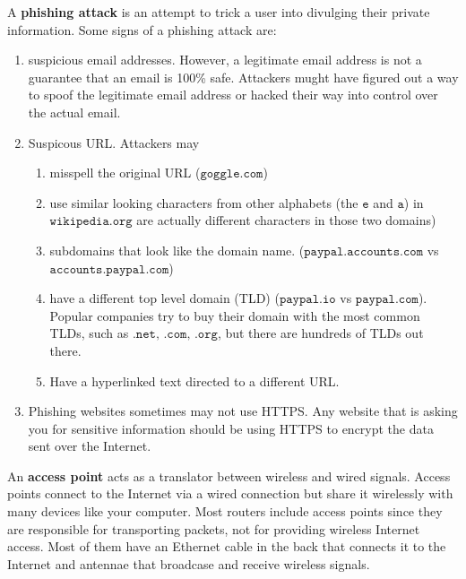 \documentclass{article}
\begin{document}
  A \textbf{phishing attack} is an attempt to trick a user into divulging their private information. Some signs of a phishing attack are: 
  \begin{enumerate}
      \item suspicious email addresses. However, a legitimate email address is not a guarantee that an email is 100\% safe. Attackers mught have figured out a way to spoof the legitimate email address or hacked their way into control over the actual email. 
      \item Suspicous URL. Attackers may
      \begin{enumerate}
          \item misspell the original URL ($\texttt{goggle.com}$)
          \item use similar looking characters from other alphabets (the $\texttt{e}$ and $\texttt{a}$) in $\texttt{wikipedia.org}$ are actually different characters in those two domains)
          \item subdomains that look like the domain name. ($\texttt{paypal.accounts.com}$ vs $\texttt{accounts.paypal.com}$)
          \item have a different top level domain (TLD) ($\texttt{paypal.io}$ vs $\texttt{paypal.com}$). Popular companies try to buy their domain with the most common TLDs, such as $\texttt{.net, .com, .org}$, but there are hundreds of TLDs out there. 
          \item Have a hyperlinked text directed to a different URL. 
      \end{enumerate} 
      \item Phishing websites sometimes may not use HTTPS. Any website that is asking you for sensitive information should be using HTTPS to encrypt the data sent over the Internet.
  \end{enumerate}

  \begin{definition}
  An \textbf{access point} acts as a translator between wireless and wired signals. Access points connect to the Internet via a wired connection but share it wirelessly with many devices like your computer. Most routers include access points since they are responsible for transporting packets, not for providing wireless Internet access. Most of them have an Ethernet cable in the back that connects it to the Internet and antennae that broadcase and receive wireless signals. 
  \end{definition}
\end{document}
